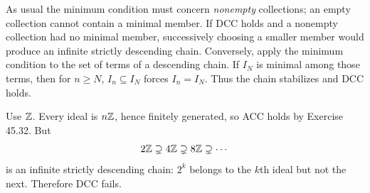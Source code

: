 As usual the minimum condition must concern \emph{nonempty} collections; an empty collection cannot contain a minimal member. If DCC holds and a nonempty collection had no minimal member, successively choosing a smaller member would produce an infinite strictly descending chain. Conversely, apply the minimum condition to the set of terms of a descending chain. If $I_N$ is minimal among those terms, then for $n\ge N$, $I_n\subseteq I_N$ forces $I_n=I_N$. Thus the chain stabilizes and DCC holds.

Use $\mathbb{Z}$. Every ideal is $n\mathbb{Z}$, hence finitely generated, so ACC holds by Exercise 45.32. But
\[2\mathbb{Z}\supsetneq4\mathbb{Z}\supsetneq8\mathbb{Z}\supsetneq\cdots\]
is an infinite strictly descending chain: $2^k$ belongs to the $k$th ideal but not the next. Therefore DCC fails.
